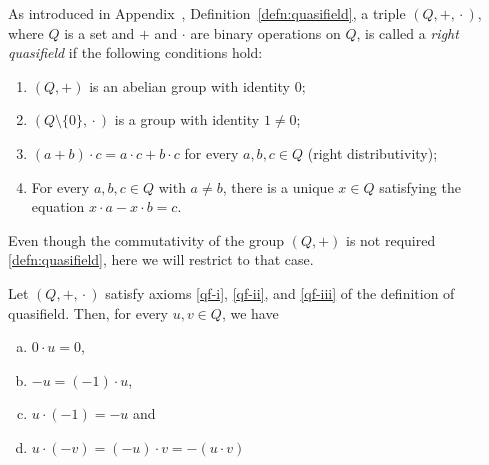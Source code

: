 \begin{defn}
    As introduced in Appendix~, Definition~\ref{defn:quasifield}, a triple\/ $(Q, +,{}\cdot{})$, where\/ $Q$ is a set and\/ $+$ and\/ $\cdot$ are binary operations on\/ $Q$, is called a \textsl{right quasifield} if the following conditions hold:
    \begin{enumerate}[\roman*.,
        ref=\upshape(\scshape\roman*),
        font=\upshape\scshape]
        \item\label{qf-i} $(Q, +)$ is an abelian group with identity\/ $0$;
        \item\label{qf-ii} $(Q \setminus \{0\}, {}\cdot{})$ is a group with identity\/ $1\ne0$;
        \item\label{qf-iii} $(a+b) \cdot c = a \cdot c + b \cdot c$ for every\/ $a,b,c \in Q$ (right distributivity);
        \item\label{qf-iv} For every\/ $a, b, c \in Q$ with\/ $a \ne b$, there is a unique\/ $x \in Q$ satisfying the equation\/ $x \cdot a - x \cdot b = c$.
    \end{enumerate}
\end{defn}

\begin{rem}
    Even though the commutativity of the group $(Q,+)$ is not required \ref{defn:quasifield}, here we will restrict to that case.
\end{rem}

\begin{prop}
    Let\/ $(Q, +, {}\cdot{})$ satisfy axioms\/ \ref{qf-i}, \ref{qf-ii}, and\/ \ref{qf-iii} of the definition of quasifield. Then, for every\/ $u, v \in Q$, we have
    \begin{enumerate}[a),font=\upshape]
        \item $0\cdot u=0$,
        \item $-u = (-1) \cdot u$,
        \item $u\cdot(-1)=-u$ and
        \item $u \cdot (-v) = (-u) \cdot v = -(u \cdot v)$
    \end{enumerate}
\end{prop}

